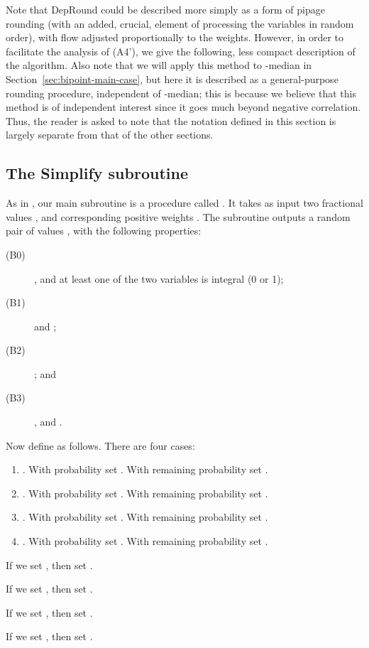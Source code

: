 Note that {\sc DepRound} could be described more simply as a form of pipage rounding (with an added, crucial, element of processing the variables in random order), with flow adjusted proportionally to the weights. However, in order to facilitate the analysis of (A4'), we give the following, less compact description of the algorithm.
Also note that we will apply this method to -median in Section~\ref{sec:bipoint-main-case}, but here it is described as a general-purpose rounding procedure, independent of -median; this is because we believe that this method is of independent interest since it goes much beyond negative correlation. Thus, the reader is asked to note that the notation defined in this section is largely separate from that of the other sections.

\subsection{The {\sc Simplify} subroutine}
\label{sec:simplify}
As in \cite{srin:level-sets}, our main subroutine is a procedure called . It takes as input two fractional values , and corresponding positive weights . The subroutine outputs a random pair of values , with the following properties:

\begin{description}
\item[(B0)] , and at least one of the two variables is integral (0 or 1);
\item[(B1)]  and ;
\item[(B2)] ; and
\item[(B3)]
, and .
\end{description}

Now define  as follows. 
There are four cases:
\begin{enumerate}
\item . With probability  set . With remaining probability set .
\item . With probability  set . With remaining probability set .
\item . With probability  set . With remaining probability set .
\item . With probability  set . With remaining probability set .
\end{enumerate}

If we set , then set .

If we set , then set .

If we set , then set .

If we set , then set .

